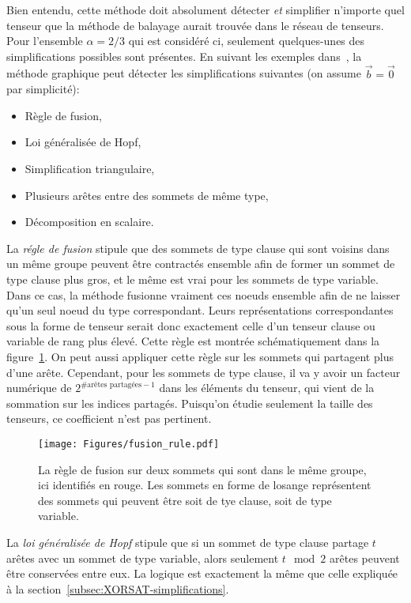 Bien entendu, cette méthode doit absolument détecter \emph{et} simplifier n'importe quel tenseur que la méthode de balayage aurait trouvée dans le réseau de tenseurs.
Pour l'ensemble $\alpha = 2/3$ qui est considéré ci, seulement quelques-unes des simplifications possibles sont présentes.
En suivant les exemples dans~\cite{denny_algebraically_2012}, la méthode graphique peut détecter les simplifications suivantes (on assume $\vec{b} = \vec{0}$ par simplicité):
\begin{itemize}
    \item Règle de fusion,
    \item Loi généralisée de Hopf,
    \item Simplification triangulaire,
    \item Plusieurs arêtes entre des sommets de même type,
    \item Décomposition en scalaire.
\end{itemize}

La \emph{régle de fusion} stipule que des sommets de type clause qui sont voisins dans un même groupe peuvent être contractés ensemble afin de former un sommet de type clause plus gros, et le même est vrai pour les sommets de type variable.
Dans ce cas, la méthode fusionne vraiment ces noeuds ensemble afin de ne laisser qu'un seul noeud du type correspondant.
Leurs représentations correspondantes sous la forme de tenseur serait donc exactement celle d'un tenseur clause ou variable de rang plus élevé.
Cette règle est montrée schématiquement dans la figure~\ref{fig:fusion_rule}.
On peut aussi appliquer cette règle sur les sommets qui partagent plus d'une arête.
Cependant, pour les sommets de type clause, il va y avoir un facteur numérique de $2^{\#\text{arêtes partagées} - 1}$ dans les éléments du tenseur, qui vient de la sommation sur les indices partagés.
Puisqu'on étudie seulement la taille des tenseurs, ce coefficient n'est pas pertinent.
\begin{figure}[h]
    \centering
    \texttt{[image: Figures/fusion\_rule.pdf]}
    \caption{La règle de fusion sur deux sommets qui sont dans le même groupe, ici identifiés en rouge. Les sommets en forme de losange représentent des sommets qui peuvent être soit de tye clause, soit de type variable.}
    \label{fig:fusion_rule}
\end{figure}

La \emph{loi généralisée de Hopf} stipule que si un sommet de type clause partage $t$ arêtes avec un sommet de type variable, alors seulement $t \mod{2}$ arêtes peuvent être conservées entre eux.
La logique est exactement la même que celle expliquée à la section~\ref{subsec:XORSAT-simplifications}.

